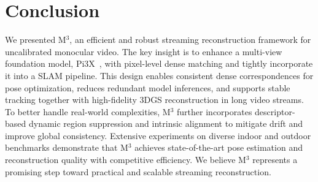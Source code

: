 \section{Conclusion}
\label{sec:conclusion}
We presented M$^3$, an efficient and robust streaming reconstruction framework for uncalibrated monocular video. The key insight is to enhance a multi-view foundation model, Pi3X~\cite{wang2025pi}, with pixel-level dense matching and tightly incorporate it into a SLAM pipeline. This design enables consistent dense correspondences for pose optimization, reduces redundant model inferences, and supports stable tracking together with high-fidelity 3DGS reconstruction in long video streams. To better handle real-world complexities, M$^3$ further incorporates descriptor-based dynamic region suppression and intrinsic alignment to mitigate drift and improve global consistency. Extensive experiments on diverse indoor and outdoor benchmarks demonstrate that M$^3$ achieves state-of-the-art pose estimation and reconstruction quality with competitive efficiency. We believe M$^3$ represents a promising step toward practical and scalable streaming reconstruction.
